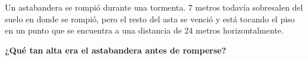 \question[15]  Un astabandera se rompió durante una tormenta.
7 metros todavía sobresalen del suelo en donde se rompió, pero el resto del asta se venció y
está tocando el piso en un punto que se encuentra a una distancia de 24 metros horizontalmente.

\textbf{¿Qué tan alta era el astabandera antes de romperse?}\\
